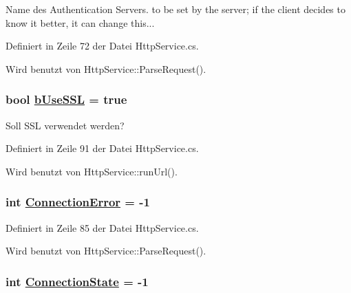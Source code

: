 Name des Authentication Servers. to be set by the server; if the client decides to know it better, it can change this... 



Definiert in Zeile 72 der Datei Http\-Service.cs.

Wird benutzt von Http\-Service::Parse\-Request().\hypertarget{classQbeSAS_1_1HttpService_1_1ServiceDataType_QbeSAS_1_1HttpService_1_1ServiceDataTypeo10}{
\subsubsection[bUseSSL]{\setlength{\rightskip}{0pt plus 5cm}bool \hyperlink{classQbeSAS_1_1HttpService_1_1ServiceDataType_QbeSAS_1_1HttpService_1_1ServiceDataTypeo10}{b\-Use\-SSL} = true}}
\label{classQbeSAS_1_1HttpService_1_1ServiceDataType_QbeSAS_1_1HttpService_1_1ServiceDataTypeo10}


Soll SSL verwendet werden? 



Definiert in Zeile 91 der Datei Http\-Service.cs.

Wird benutzt von Http\-Service::run\-Url().\hypertarget{classQbeSAS_1_1HttpService_1_1ServiceDataType_QbeSAS_1_1HttpService_1_1ServiceDataTypeo8}{
\subsubsection[ConnectionError]{\setlength{\rightskip}{0pt plus 5cm}int \hyperlink{classQbeSAS_1_1HttpService_1_1ServiceDataType_QbeSAS_1_1HttpService_1_1ServiceDataTypeo8}{Connection\-Error} = -1}}
\label{classQbeSAS_1_1HttpService_1_1ServiceDataType_QbeSAS_1_1HttpService_1_1ServiceDataTypeo8}




Definiert in Zeile 85 der Datei Http\-Service.cs.

Wird benutzt von Http\-Service::Parse\-Request().\hypertarget{classQbeSAS_1_1HttpService_1_1ServiceDataType_QbeSAS_1_1HttpService_1_1ServiceDataTypeo7}{
\subsubsection[ConnectionState]{\setlength{\rightskip}{0pt plus 5cm}int \hyperlink{classQbeSAS_1_1HttpService_1_1ServiceDataType_QbeSAS_1_1HttpService_1_1ServiceDataTypeo7}{Connection\-State} = -1}}
\label{classQbeSAS_1_1HttpService_1_1ServiceDataType_QbeSAS_1_1HttpService_1_1ServiceDataTypeo7}




